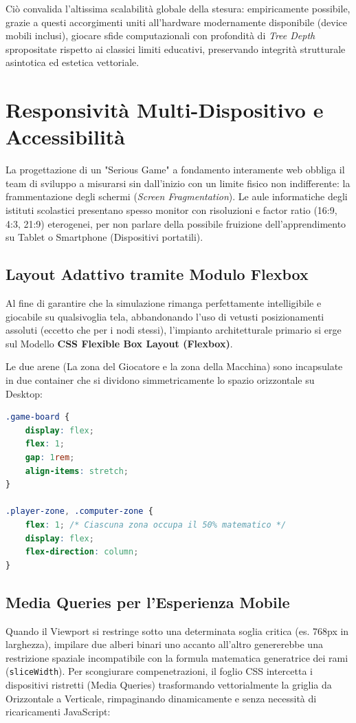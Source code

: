 \documentclass[openany]{theme/uniprthesis}
\begin{document}
Ciò convalida l'altissima scalabilità globale della stesura:  empiricamente possibile, grazie a questi accorgimenti uniti all'hardware modernamente disponibile (device mobili inclusi), giocare sfide computazionali con profondità di \textit{Tree Depth} spropositate rispetto ai classici limiti educativi, preservando integrità strutturale asintotica ed estetica vettoriale.

\section{Responsività Multi-Dispositivo e Accessibilità}
La progettazione di un "Serious Game" a fondamento interamente web obbliga il team di sviluppo a misurarsi sin dall'inizio con un limite fisico non indifferente: la frammentazione degli schermi (\textit{Screen Fragmentation}). Le aule informatiche degli istituti scolastici presentano spesso monitor con risoluzioni e factor ratio (16:9, 4:3, 21:9) eterogenei, per non parlare della possibile fruizione dell'apprendimento su Tablet o Smartphone (Dispositivi portatili).

\subsection{Layout Adattivo tramite Modulo Flexbox}
Al fine di garantire che la simulazione rimanga perfettamente intelligibile e giocabile su qualsivoglia tela, abbandonando l'uso di vetusti posizionamenti assoluti (eccetto che per i nodi stessi), l'impianto architetturale primario si erge sul Modello \textbf{CSS Flexible Box Layout (Flexbox)}.

Le due arene (La zona del Giocatore e la zona della Macchina) sono incapsulate in due container che si dividono simmetricamente lo spazio orizzontale su Desktop:
\begin{lstlisting}[language=CSS, breaklines=true, basicstyle=\footnotesize\ttfamily, frame=single, caption={Divisione simmetrica desktop delle aree di gioco}, keywordstyle=\color{blue}]
.game-board {
    display: flex;
    flex: 1;
    gap: 1rem;
    align-items: stretch;
}

.player-zone, .computer-zone {
    flex: 1; /* Ciascuna zona occupa il 50% matematico */
    display: flex;
    flex-direction: column;
}
\end{lstlisting}

\subsection{Media Queries per l'Esperienza Mobile}
Quando il Viewport si restringe sotto una determinata soglia critica (es. 768px in larghezza), impilare due alberi binari uno accanto all'altro genererebbe una restrizione spaziale incompatibile con la formula matematica generatrice dei rami (\texttt{sliceWidth}). Per scongiurare compenetrazioni, il foglio CSS intercetta i dispositivi ristretti (Media Queries) trasformando vettorialmente la griglia da Orizzontale a Verticale, rimpaginando dinamicamente e senza necessità di ricaricamenti JavaScript:
\end{document}
